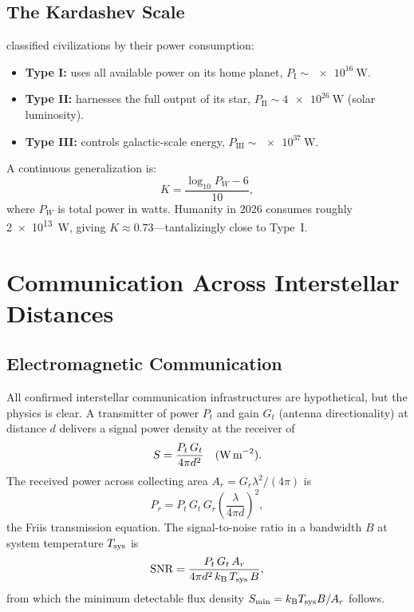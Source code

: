 \documentclass[12pt,a4paper]{article}
\newcommand{\kB}{k_{\mathrm{B}}}
\begin{document}
\subsection{The Kardashev Scale}
\label{sec:kardashev}

\citet{Kardashev1964} classified civilizations by their power consumption:
\begin{itemize}[noitemsep]
  \item \textbf{Type I:} uses all available power on its home planet,
    $P_{\mathrm{I}} \sim \SI{e16}{\watt}$.
  \item \textbf{Type II:} harnesses the full output of its star,
    $P_{\mathrm{II}} \sim \SI{4e26}{\watt}$ (solar luminosity).
  \item \textbf{Type III:} controls galactic-scale energy,
    $P_{\mathrm{III}} \sim \SI{e37}{\watt}$.
\end{itemize}
A continuous generalization \citep{Sagan1973} is:
\begin{equation}
  K = \frac{\log_{10} P_W - 6}{10},
  \label{eq:kardashev}
\end{equation}
where $P_W$ is total power in watts. Humanity in 2026 consumes roughly
\SI{2e13}{\watt}, giving $K \approx 0.73$---tantalizingly close to Type~I.

\section{Communication Across Interstellar Distances}

\subsection{Electromagnetic Communication}

All confirmed interstellar communication infrastructures are hypothetical, but
the physics is clear. A transmitter of power $P_t$ and gain $G_t$ (antenna
directionality) at distance $d$ delivers a signal power density at the
receiver of
\begin{equation}
  S = \frac{P_t\,G_t}{4\pi d^2}\quad (\text{W\,m}^{-2}).
  \label{eq:signal_density}
\end{equation}
The received power across collecting area $A_r = G_r\lambda^2/(4\pi)$ is
\begin{equation}
  P_r = P_t\,G_t\,G_r\!\left(\frac{\lambda}{4\pi d}\right)^2,
  \label{eq:friis}
\end{equation}
the Friis transmission equation. The signal-to-noise ratio in a bandwidth $B$
at system temperature $T_{\rm sys}$ is
\begin{equation}
  \mathrm{SNR} = \frac{P_t\,G_t\,A_r}{4\pi d^2\,\kB\,T_{\rm sys}\,B},
  \label{eq:snr}
\end{equation}
from which the minimum detectable flux density
$S_{\min} = \kB T_{\rm sys} B / A_r$ follows.
\end{document}
